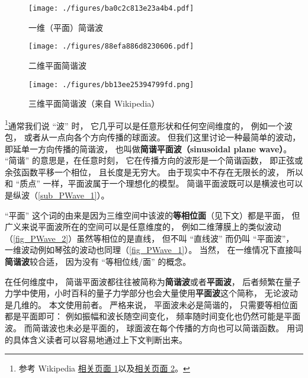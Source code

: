 
\begin{figure}[ht]
\centering
\texttt{[image: ./figures/ba0c2c813e23a4b4.pdf]}
\caption{一维（平面）简谐波} \label{fig_PWave_1}
\end{figure}

\begin{figure}[ht]
\centering
\texttt{[image: ./figures/88efa886d8230606.pdf]}
\caption{二维平面简谐波} \label{fig_PWave_2}
\end{figure}

\begin{figure}[ht]
\centering
\texttt{[image: ./figures/bb13ee25394799fd.png]}
\caption{三维平面简谐波（来自 Wikipedia）} \label{fig_PWave_3}
\end{figure}


\footnote{参考 Wikipedia \href{https://en.wikipedia.org/wiki/Plane_wave}{相关页面 1}以及\href{https://en.wikipedia.org/wiki/Sinusoidal_plane_wave}{相关页面 2}。}通常我们说 “波” 时， 它几乎可以是任意形状和任何空间维度的， 例如一个波包， 或者从一点向各个方向传播的球面波。 但我们这里讨论一种最简单的波动， 即延单一方向传播的简谐波， 也叫做\textbf{简谐平面波（sinusoidal plane wave）}。 “简谐” 的意思是，在任意时刻， 它在传播方向的波形是一个简谐函数， 即正弦或余弦函数平移一个相位， 且长度是无穷大。 由于现实中不存在无限长的波， 所以和 “质点” 一样，平面波属于一个理想化的模型。 简谐平面波既可以是横波也可以是纵波（\autoref{sub_PWave_1}）。

“平面” 这个词的由来是因为三维空间中该波的\textbf{等相位面}（见下文）都是平面， 但广义来说平面波所在的空间可以是任意维度的， 例如二维薄膜上的类似波动（\autoref{fig_PWave_2}）虽然等相位的是直线， 但不叫 “直线波” 而仍叫 “平面波”， 一维波动例如琴弦的波动也同理（\autoref{fig_PWave_1}）。 当然， 在一维情况下直接叫\textbf{简谐波}较合适， 因为没有 “等相位线/面” 的概念。

在任何维度中， 简谐平面波都往往被简称为\textbf{简谐波}或者\textbf{平面波}， 后者频繁在量子力学中使用，小时百科的量子力学部分也会大量使用\textbf{平面波}这个简称， 无论波动是几维的。 本文使用前者。 严格来说， 平面波未必是简谐的， 只需要等相位面都是平面即可： 例如振幅和波长随空间变化， 频率随时间变化也仍然可能是平面波。 而简谐波也未必是平面的， 球面波在每个传播的方向也可以简谐函数。 用词的具体含义读者可以容易地通过上下文判断出来。

